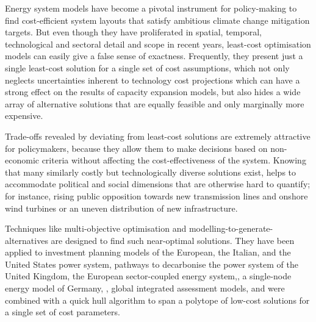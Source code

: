 
Energy system models have become a pivotal instrument for policy-making to find
cost-efficient system layouts that satisfy ambitious climate change mitigation
targets. But even though they have proliferated in spatial, temporal,
technological and sectoral detail and scope in recent years, least-cost
optimisation models can easily give a false sense of
exactness.\cite{Trutnevyte2016, pye_modelling_2020} Frequently, they present
just a single least-cost solution for a single set of cost assumptions, which
not only neglects uncertainties inherent to technology cost projections which
can have a strong effect on the results of capacity expansion models,
\cite{trondle_trade-offs_2020, yue_review_2018, pye_assessing_2018} but also
hides a wide array of alternative solutions that are equally feasible and only
marginally more expensive.\cite{nearoptimal, lombardi_policy_2020,
sasse_regional_2020}


Trade-offs revealed by deviating from least-cost solutions are extremely
attractive for policymakers, because they allow them to make decisions based on
non-economic criteria without affecting the cost-effectiveness of the system.
Knowing that many similarly costly but technologically diverse solutions exist,
helps to accommodate political and social dimensions that are otherwise hard to
quantify; for instance, rising public opposition towards new transmission
lines and onshore wind turbines or an uneven distribution of new infrastructure.
\cite{mccollum_energy_2020,sasse_regional_2020,schlachtberger_cost_2018}


Techniques like multi-objective optimisation and
modelling-to-generate-alternatives are designed to find such near-optimal
solutions. They have been applied to investment planning models of the
European,\cite{nearoptimal} the Italian, \cite{lombardi_policy_2020} and the
United States power system, \cite{DeCarolis2016} pathways to decarbonise the
power system of the United Kingdom,\cite{Li2017} the European sector-coupled
energy system,\cite{pickeringDiversityOptions2022}, a single-node energy model of Germany,
\cite{nacken_integrated_2019}, global integrated assessment models,
\cite{Price2017} and were combined with a quick hull algorithm to span a
polytope of low-cost solutions for a single set of cost parameters.\cite{pedersen_modeling_2020}


